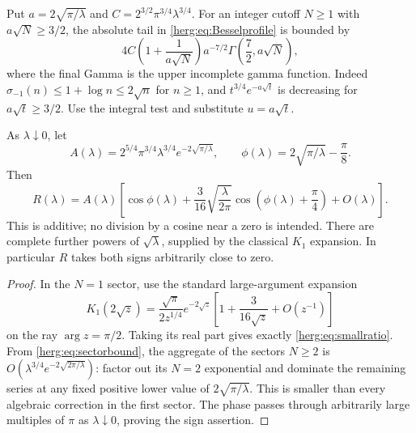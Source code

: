 \begin{remark}
\label{herg:rem:Besseltail}
Put $a=2\sqrt{\pi/\lambda}$ and
$C=2^{3/2}\pi^{3/4}\lambda^{3/4}$. For an integer cutoff $N\geq1$
with $a\sqrt N\geq3/2$, the absolute tail in
\eqref{herg:eq:Besselprofile} is bounded by
\begin{equation}\label{herg:eq:Besseltail}
 4C\left(1+\frac1{a\sqrt N}\right)a^{-7/2}
                  \Gamma\left(\frac72,a\sqrt N\right),
\end{equation}
where the final Gamma is the upper incomplete gamma function.
Indeed $\sigma_{-1}(n)\leq1+\log n\leq2\sqrt n$ for $n\geq1$,
and $t^{3/4}e^{-a\sqrt t}$ is decreasing for $a\sqrt t\geq3/2$.
Use the integral test and substitute $u=a\sqrt t$.
\end{remark}

\begin{corollary}
\label{herg:cor:smallratio}
As $\lambda\downarrow0$, let
\[
 A(\lambda)=2^{5/4}\pi^{3/4}\lambda^{3/4}
                       e^{-2\sqrt{\pi/\lambda}},\qquad
 \phi(\lambda)=2\sqrt{\pi/\lambda}-\frac\pi8.
\]
Then
\begin{equation}\label{herg:eq:smallratio}
 R(\lambda)=A(\lambda)
 \left[\cos\phi(\lambda)
 +\frac3{16}\sqrt{\frac\lambda{2\pi}}
       \cos\left(\phi(\lambda)+\frac\pi4\right)+O(\lambda)\right].
\end{equation}
This is additive; no division by a cosine near a zero is intended.
There are complete further powers of $\sqrt\lambda$, supplied by
the classical $K_1$ expansion. In particular $R$ takes both signs
arbitrarily close to zero.
\end{corollary}
\begin{proof}
In the $N=1$ sector, use the standard large-argument expansion
\cite[Eq.~10.40.2]{herg:DLMFbessel}
\[
 K_1(2\sqrt z)=\frac{\sqrt\pi}{2z^{1/4}}e^{-2\sqrt z}
        \left[1+\frac3{16\sqrt z}+O(z^{-1})\right]
\]
on the ray $\arg z=\pi/2$. Taking its real part gives exactly
\eqref{herg:eq:smallratio}. From \eqref{herg:eq:sectorbound},
the aggregate of the sectors $N\geq2$ is
$O(\lambda^{3/4}e^{-2\sqrt{2\pi/\lambda}})$: factor out its
$N=2$ exponential and dominate the remaining series at any fixed
positive lower value of $2\sqrt{\pi/\lambda}$. This is smaller
than every algebraic correction in the first sector. The phase
passes through arbitrarily large multiples of $\pi$ as
$\lambda\downarrow0$, proving the sign assertion.
\end{proof}

